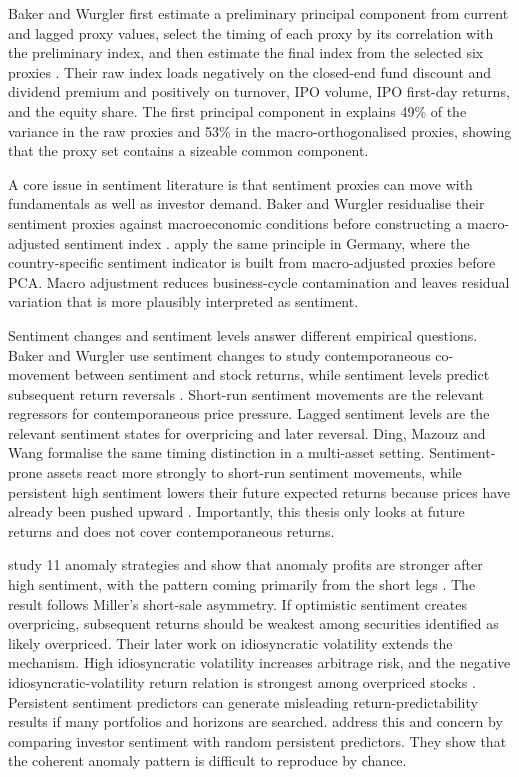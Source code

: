 \documentclass[11pt]{article}
\begin{document}
Baker and Wurgler first estimate a preliminary principal component from current and lagged proxy values, select the timing of each proxy by its correlation with the preliminary index, and then estimate the final index from the selected six proxies \citep{baker2006sentiment}. Their raw index loads negatively on the closed-end fund discount and dividend premium and positively on turnover, IPO volume, IPO first-day returns, and the equity share. The first principal component in \citet{baker2006sentiment} explains 49\% of the variance in the raw proxies and 53\% in the macro-orthogonalised proxies, showing that the proxy set contains a sizeable common component.

A core issue in sentiment literature is that sentiment proxies can move with fundamentals as well as investor demand. Baker and Wurgler residualise their sentiment proxies against macroeconomic conditions before constructing a macro-adjusted sentiment index \citep{baker2006sentiment}. \citet{finter2012german} apply the same principle in Germany, where the country-specific sentiment indicator is built from macro-adjusted proxies before PCA. Macro adjustment reduces business-cycle contamination and leaves residual variation that is more plausibly interpreted as sentiment.

Sentiment changes and sentiment levels answer different empirical questions. Baker and Wurgler use sentiment changes to study contemporaneous co-movement between sentiment and stock returns, while sentiment levels predict subsequent return reversals \citep{baker2007}. Short-run sentiment movements are the relevant regressors for contemporaneous price pressure. Lagged sentiment levels are the relevant sentiment states for overpricing and later reversal. Ding, Mazouz and Wang formalise the same timing distinction in a multi-asset setting. Sentiment-prone assets react more strongly to short-run sentiment movements, while persistent high sentiment lowers their future expected returns because prices have already been pushed upward \citep{ding2019newtheory}. Importantly, this thesis only looks at future returns and does not cover contemporaneous returns.

\citet{stambaugh2012short} study 11 anomaly strategies and show that anomaly profits are stronger after high sentiment, with the pattern coming primarily from the short legs \citep{stambaugh2012short}. The result follows Miller's short-sale asymmetry. If optimistic sentiment creates overpricing, subsequent returns should be weakest among securities identified as likely overpriced. Their later work on idiosyncratic volatility extends the mechanism. High idiosyncratic volatility increases arbitrage risk, and the negative idiosyncratic-volatility return relation is strongest among overpriced stocks \citep{stambaugh2015ivol}. Persistent sentiment predictors can generate misleading return-predictability results if many portfolios and horizons are searched. \citet{stambaugh2014long} address this and concern by comparing investor sentiment with random persistent predictors. They show that the coherent anomaly pattern is difficult to reproduce by chance.
\end{document}
